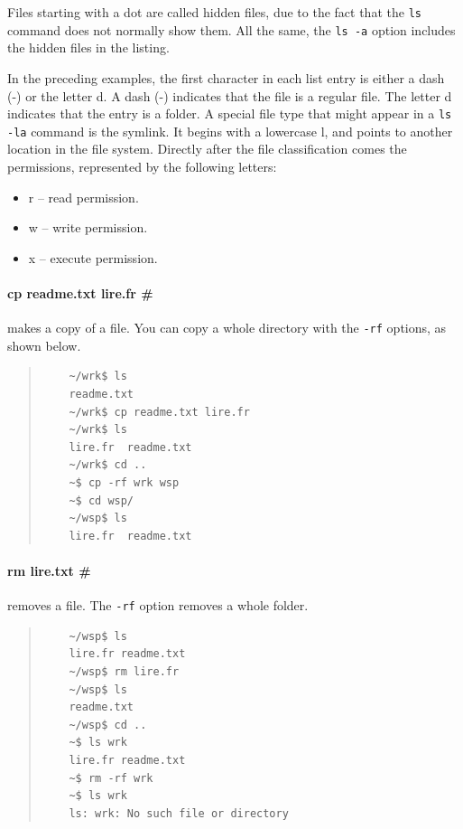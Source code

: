 \documentclass[a4paper,12pt]{book}
\begin{document}
Files starting with a dot are called hidden files,
due to the fact that the \verb|ls| command does not
normally show them. All the same,
the \verb|ls -a| option includes the
hidden files in the listing.

In the preceding examples, the first character
in each list entry is either a dash (-) or the letter d.
A dash (-) indicates that the file is a regular file.
The letter d indicates that the entry is a folder.
A special file type that might appear in a
\verb|ls -la| command is the symlink. It begins
with a lowercase l, and points to another location
in the file system.
Directly after the file classification comes the permissions,
represented by the following letters:
\begin{itemize}
	\item r -- read permission.
	\item w -- write permission.
	\item x -- execute permission.
\end{itemize}

\paragraph{cp readme.txt lire.fr \#} 
makes a copy
of a file. You can copy a whole directory
with the \verb|-rf| options, as shown below.
\begin{quote}
	\begin{verbatim}
	~/wrk$ ls
	readme.txt
	~/wrk$ cp readme.txt lire.fr
	~/wrk$ ls
	lire.fr  readme.txt
	~/wrk$ cd ..
	~$ cp -rf wrk wsp
	~$ cd wsp/
	~/wsp$ ls
	lire.fr  readme.txt
	\end{verbatim}
\end{quote}

\paragraph{rm lire.txt \#} 
removes a file.
The \verb|-rf| option 
removes a whole folder.
\begin{quote}
	\begin{verbatim}
	~/wsp$ ls
	lire.fr readme.txt
	~/wsp$ rm lire.fr
	~/wsp$ ls
	readme.txt
	~/wsp$ cd ..
	~$ ls wrk
	lire.fr readme.txt
	~$ rm -rf wrk
	~$ ls wrk
	ls: wrk: No such file or directory
	\end{verbatim}
\end{quote}
\end{document}
